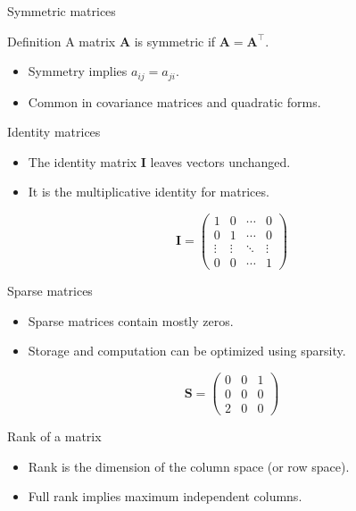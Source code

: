 \documentclass[12pt]{beamer}
\begin{document}
\begin{frame}{Symmetric matrices}
  \begin{conceptbox}{Definition}
    A matrix $\bm{A}$ is symmetric if $\bm{A} = \bm{A}^\top$.
  \end{conceptbox}
  \begin{itemize}
    \item Symmetry implies $a_{ij} = a_{ji}$.
    \item Common in covariance matrices and quadratic forms.
  \end{itemize}
\end{frame}

\begin{frame}{Identity matrices}
  \begin{itemize}
    \item The identity matrix $\bm{I}$ leaves vectors unchanged.
    \item It is the multiplicative identity for matrices.
  \end{itemize}
  \[
  \bm{I} =
  \begin{pmatrix}
  1 & 0 & \cdots & 0 \\
  0 & 1 & \cdots & 0 \\
  \vdots & \vdots & \ddots & \vdots \\
  0 & 0 & \cdots & 1
  \end{pmatrix}
  \]
\end{frame}

\begin{frame}{Sparse matrices}
  \begin{itemize}
    \item Sparse matrices contain mostly zeros.
    \item Storage and computation can be optimized using sparsity.
  \end{itemize}
  \[
  \bm{S} =
  \begin{pmatrix}
  0 & 0 & 1 \\
  0 & 0 & 0 \\
  2 & 0 & 0
  \end{pmatrix}
  \]
\end{frame}

\begin{frame}{Rank of a matrix}
  \begin{itemize}
    \item Rank is the dimension of the column space (or row space).
    \item Full rank implies maximum independent columns.
  \end{itemize}
\end{frame}
\end{document}
